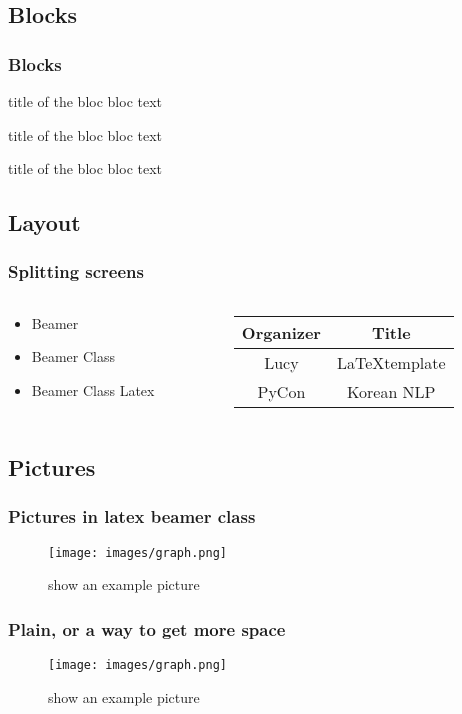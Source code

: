 \documentclass[compress]{beamer}
\begin{document}
\subsection{Blocks}
\begin{frame}\frametitle{Blocks}
    \begin{block}{title of the bloc}
        bloc text
    \end{block}
    \begin{exampleblock}{title of the bloc}
        bloc text
    \end{exampleblock}
    \begin{alertblock}{title of the bloc}
        bloc text
    \end{alertblock}
\end{frame}

\subsection{Layout}
\begin{frame}\frametitle{Splitting screens}
    \begin{columns}
        \begin{column}{5cm}
            \begin{itemize}
                \item Beamer
                \item Beamer Class
                \item Beamer Class Latex
            \end{itemize}
        \end{column}
        \begin{column}{5cm}
            \begin{tabular}{|c|c|}
                \hline
                \textbf{Organizer} & \textbf{Title} \\ \hline
                Lucy &  \LaTeX template \\ \hline
                PyCon & Korean NLP \\
                \hline
            \end{tabular}
        \end{column}
    \end{columns}
\end{frame}

\subsection{Pictures}
\begin{frame}\frametitle{Pictures in latex beamer class}
    \begin{figure}
        \texttt{[image: images/graph.png]}
        \caption{show an example picture}
    \end{figure}
\end{frame}
\begin{frame}[plain]
    \frametitle{Plain, or a way to get more space}
    \begin{figure}
        \texttt{[image: images/graph.png]}
        \caption{show an example picture}
    \end{figure}
\end{frame}
\end{document}
